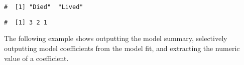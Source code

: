 \documentclass[letterpaper,12pt,twoside,]{pinp}
\begin{document}
\begin{Shaded}
\begin{Highlighting}[]
\OperatorTok{$}\StringTok{ }\OperatorTok{$} \NormalTok{(}\OperatorTok{$}

\OperatorTok{$}
\end{Highlighting}
\end{Shaded}

\begin{ShadedResult}
\begin{verbatim}
#  [1] "Died"  "Lived"
\end{verbatim}
\end{ShadedResult}

\begin{Shaded}
\begin{Highlighting}[]
\StringTok{ }\NormalTok{(}\NormalTok{, }\NormalTok{, }\NormalTok{)}
\end{Highlighting}
\end{Shaded}

\begin{ShadedResult}
\begin{verbatim}
#  [1] 3 2 1
\end{verbatim}
\end{ShadedResult}

The following example shows outputting the model summary, selectively
outputting model coefficients from the model fit, and extracting the
numeric value of a coefficient.

\begin{Shaded}
\begin{Highlighting}[]
\StringTok{ }\OperatorTok{~}\StringTok{ } \NormalTok{(} \NormalTok{))}

\end{Highlighting}
\end{Shaded}
\end{document}
